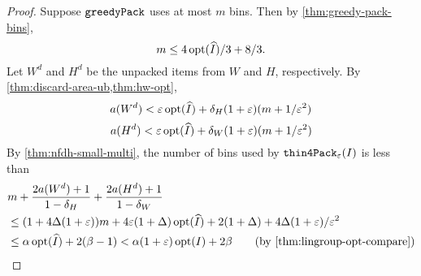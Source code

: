 \rthmThinGPackAppx*
\begin{proof}
Suppose $\operatorname{\mathtt{greedyPack}}$ uses at most $m$ bins. Then by \cref{thm:greedy-pack-bins},
\[ m \le 4\operatorname{opt}(\widehat{I})/3 + 8/3. \]
Let $W^d$ and $H^d$ be the unpacked items from $W$ and $H$, respectively.
By \cref{thm:discard-area-ub,thm:hw-opt},
\[ a(W^d) < \varepsilon\operatorname{opt}(\widehat{I}) + \delta_H(1 + \varepsilon)(m + 1/\varepsilon^2) \]
\[ a(H^d) < \varepsilon\operatorname{opt}(\widehat{I}) + \delta_W(1 + \varepsilon)(m + 1/\varepsilon^2) \]
By \cref{thm:nfdh-small-multi}, the number of bins used by $\operatorname{\mathtt{thin4Pack}}_{\varepsilon}(I)$ is less than
\begin{align*}
& m + \frac{2a(W^d)+1}{1-\delta_H} + \frac{2a(H^d)+1}{1-\delta_W}
\\ &\le (1 + 4\Delta(1+\eps))m + 4\eps(1+\Delta)\opt(\Ihat)
    + 2(1+\Delta) + 4\Delta(1+\eps)/\eps^2
\\ &\le \alpha\opt(\Ihat) + 2(\beta - 1)
< \alpha(1+\eps)\opt(I) + 2\beta
\tag{by \cref{thm:lingroup-opt-compare}}
\end{align*}
\end{proof}
